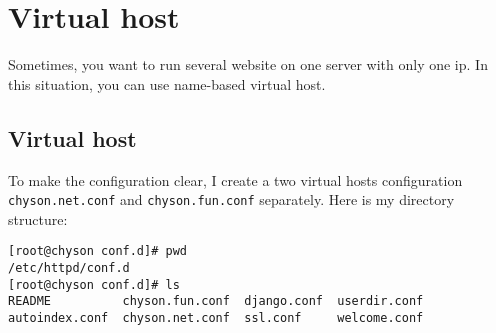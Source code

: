 
\chapter{Virtual host}

Sometimes, you want to run several website on one server with only one ip.
In this situation, you can use name-based virtual host.


\section{Virtual host}

To make the configuration clear, I create a two virtual hosts configuration \verb|chyson.net.conf| and \verb|chyson.fun.conf| separately.
Here is my directory structure:
\begin{verbatim}
[root@chyson conf.d]# pwd
/etc/httpd/conf.d
[root@chyson conf.d]# ls
README          chyson.fun.conf  django.conf  userdir.conf
autoindex.conf  chyson.net.conf  ssl.conf     welcome.conf
\end{verbatim}


